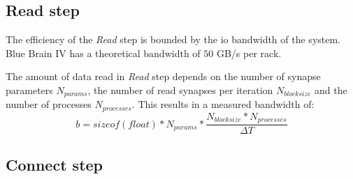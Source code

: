 \subsection{Read step}
The efficiency of the \emph{Read} step is bounded by the io bandwidth of the system.
Blue Brain IV has a theoretical bandwidth of $50$ GB/s per rack.

The amount of data read in \emph{Read} step depends on the number of synapse parameters $N_{params}$,
the number of read synapses per iteration $N_{blocksize}$ and the number of processes $N_{processes}$.
This results in a measured bandwidth of:
\begin{equation}
b = sizeof(float) * N_{params} * \frac{N_{blocksize} * N_{processes}}{\Delta T}
\end{equation}
\subsection{Connect step}

